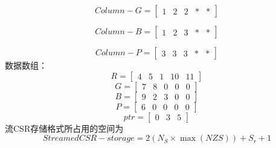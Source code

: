 \documentclass[forprint]{WHUBachelor}
\begin{document}
\begin{equation} 
Column-G = \left[ \begin{array}{lllll}{1} & {2} & {2} & {*} & {*}\end{array}\right]
 \end{equation}

\begin{equation} 
Column-B = \left[ \begin{array}{lllll}{1} & {2} & {3} & {*} & {*}\end{array}\right]
 \end{equation}

\begin{equation} 
Column-P = \left[ \begin{array}{lllll}{3} & {3} & {3} & {*} & {*}\end{array}\right]
 \end{equation}
数据数组：
\begin{equation} 
R=\left[ \begin{array}{lllll}{4} & {5} & {1} & {10} & {11}\end{array}\right]
 \end{equation}
\begin{equation} 
G =\left[ \begin{array}{lllll}{7} & {8} & {0} & {0} & {0}\end{array}\right]
 \end{equation}
\begin{equation} 
B = \left[ \begin{array}{lllll}{9} & {2} & {3} & {0} & {0}\end{array}\right]
 \end{equation}
\begin{equation} 
P = \left[ \begin{array}{lllll}{6} & {0} & {0} & {0} & {0}\end{array}\right]
 \end{equation}
\begin{equation} 
p t r=\left[ \begin{array}{lll}{0} & {3} & {5}\end{array}\right]
 \end{equation}
流CSR存储格式所占用的空间为
\begin{equation} 
StreamedCSR-storage=2\left(N_{S} \times \max (N Z S)\right)+S_{r}+1
 \end{equation}
\end{document}
